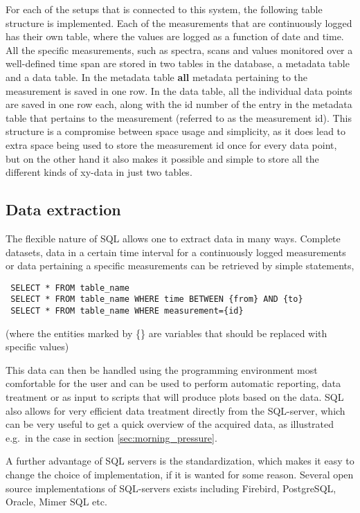 For each of the setups that is connected to this system, the following
table structure is implemented. Each of the measurements that are
continuously logged has their own table, where the values are logged
as a function of date and time. All the specific measurements, such as
spectra, scans and values monitored over a well-defined time span are
stored in two tables in the database, a metadata table and a data
table. In the metadata table \textbf{all} metadata pertaining to the
measurement is saved in one row. In the data table, all the individual
data points are saved in one row each, along with the id number of the
entry in the metadata table that pertains to the measurement (referred
to as the measurement id). This structure is a compromise between
space usage and simplicity, as it does lead to extra space being used
to store the measurement id once for every data point, but on the
other hand it also makes it possible and simple to store all the
different kinds of xy-data in just two tables.

\subsection{Data extraction} \label{sec:data_extraction}
The flexible nature of SQL allows one to extract data in many
ways. Complete datasets, data in a certain time interval for a
continuously logged measurements or data pertaining a specific
measurements can be retrieved by simple statements,
\begin{verbatim}
 SELECT * FROM table_name
 SELECT * FROM table_name WHERE time BETWEEN {from} AND {to}
 SELECT * FROM table_name WHERE measurement={id}
\end{verbatim}
(where the entities marked by \{\} are variables that should be
replaced with specific values)

This data can then be handled using the programming environment most
comfortable for the user and can be used to perform automatic
reporting, data treatment or as input to scripts that will produce
plots based on the data. SQL also allows for very efficient data
treatment directly from the SQL-server, which can be very useful to
get a quick overview of the acquired data, as illustrated e.g.\ in the
case in section \ref{sec:morning_pressure}.

A further advantage of SQL servers is the standardization, which makes it easy to
change the choice of implementation, if it is wanted for some reason. Several
open source implementations of SQL-servers exists including Firebird,
PostgreSQL, Oracle, Mimer SQL etc.
